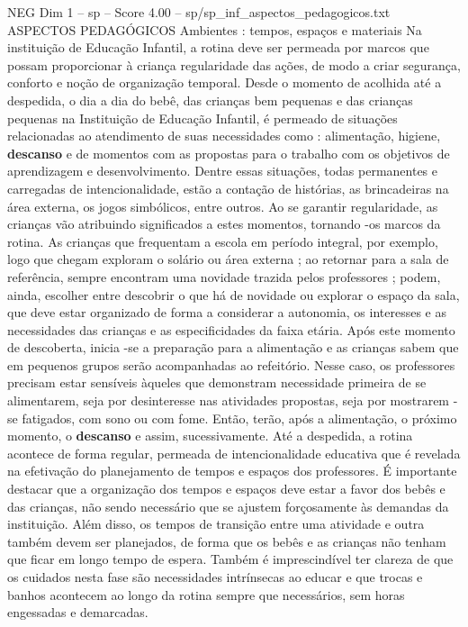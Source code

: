 \begin{textsample}{NEG Dim 1 – sp – Score 4.00 – sp/sp\_inf\_aspectos\_pedagogicos.txt}  \label{ex:f1_neg_172}
ASPECTOS PEDAGÓGICOS Ambientes : tempos, espaços e materiais Na instituição de Educação Infantil, a rotina deve ser permeada por marcos que possam proporcionar à criança regularidade das ações, de modo a criar segurança, conforto e noção de organização temporal.
Desde o momento de acolhida até a despedida, o dia a dia do bebê, das crianças bem pequenas e das crianças pequenas na Instituição de Educação Infantil, é permeado de situações relacionadas ao atendimento de suas necessidades como : alimentação, higiene, \textbf{descanso} e de momentos com as propostas para o trabalho com os objetivos de aprendizagem e desenvolvimento.
Dentre essas situações, todas permanentes e carregadas de intencionalidade, estão a contação de histórias, as brincadeiras na área externa, os jogos simbólicos, entre outros.
Ao se garantir regularidade, as crianças vão atribuindo significados a estes momentos, tornando -os marcos da rotina.
As crianças que frequentam a escola em período integral, por exemplo, logo que chegam exploram o solário ou área externa ; ao retornar para a sala de referência, sempre encontram uma novidade trazida pelos professores ; podem, ainda, escolher entre descobrir o que há de novidade ou explorar o espaço da sala, que deve estar organizado de forma a considerar a autonomia, os interesses e as necessidades das crianças e as especificidades da faixa etária.
Após este momento de descoberta, inicia -se a preparação para a alimentação e as crianças sabem que em pequenos grupos serão acompanhadas ao refeitório.
Nesse caso, os professores precisam estar sensíveis àqueles que demonstram necessidade primeira de se alimentarem, seja por desinteresse nas atividades propostas, seja por mostrarem -se fatigados, com sono ou com fome.
Então, terão, após a alimentação, o próximo momento, o \textbf{descanso} e assim, sucessivamente.
Até a despedida, a rotina acontece de forma regular, permeada de intencionalidade educativa que é revelada na efetivação do planejamento de tempos e espaços dos professores.
É importante destacar que a organização dos tempos e espaços deve estar a favor dos bebês e das crianças, não sendo necessário que se ajustem forçosamente às demandas da instituição.
Além disso, os tempos de transição entre uma atividade e outra também devem ser planejados, de forma que os bebês e as crianças não tenham que ficar em longo tempo de espera.
Também é imprescindível ter clareza de que os cuidados nesta fase são necessidades intrínsecas ao educar e que trocas e banhos acontecem ao longo da rotina sempre que necessários, sem horas engessadas e demarcadas.

\end{textsample}

